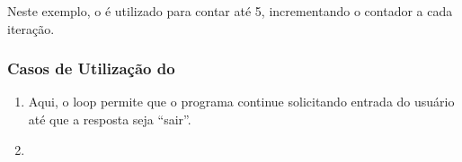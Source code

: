 \documentclass[letterpaper,10pt,english]{jupyterBook}
\begin{document}
\begin{sphinxVerbatim}[commandchars=\\\{\}]
\end{sphinxVerbatim}

\sphinxAtStartPar
Neste exemplo, o  é utilizado para contar até 5, incrementando o contador a cada iteração.


\subsubsection{Casos de Utilização do }
\label{\detokenize{chapters/ch4/ch4:casos-de-utilizacao-do-while}}\begin{enumerate}
%
\item {} 
\sphinxAtStartPar
{}

\begin{sphinxVerbatim}[commandchars=\\\{\}]
  
   
      
\end{sphinxVerbatim}

\sphinxAtStartPar
Aqui, o loop  permite que o programa continue solicitando entrada do usuário até que a resposta seja “sair”.

\item {} 
\sphinxAtStartPar
{}

\begin{sphinxVerbatim}[commandchars=\\\{\}]
  
  
  
   
      
      
\end{sphinxVerbatim}


\end{enumerate}
\end{document}
